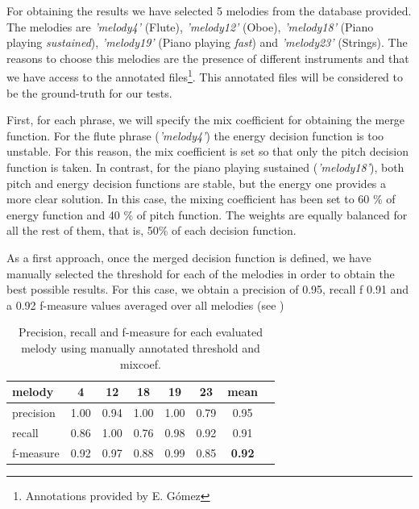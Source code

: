 \documentclass{article}
\begin{document}
For obtaining the results we have selected 5 melodies from the database provided. The melodies are \textit{'melody4'} (Flute), \textit{'melody12'} (Oboe), \textit{'melody18'} (Piano playing \textit{sustained}), \textit{'melody19'} (Piano playing \textit{fast}) and \textit{'melody23'} (Strings). The reasons to choose this melodies are the presence of different instruments and that we have access to the annotated files\footnote{Annotations provided by E. G\'omez}. This annotated files will be considered to be the ground-truth for our tests.
 
First, for each phrase, we will specify the mix coefficient for obtaining the merge function. For the flute phrase (\textit{'melody4'}) the energy decision function is too unstable. For this reason, the mix coefficient is set so that only the pitch decision function is taken. In contrast, for the piano playing sustained (\textit{'melody18'}), both pitch and energy decision functions are stable, but the energy one provides a more clear solution. In this case, the mixing coefficient has been set to 60 \% of energy function and 40 \% of pitch function. The weights are equally balanced for all the rest of them, that is, 50\% of each decision function.

As a first approach, once the merged decision function is defined, we have manually selected the threshold for each of the melodies in order to obtain the best possible results. For this case, we obtain a precision of 0.95, recall f 0.91 and a 0.92 f-measure values averaged over all melodies (see )

\begin{table}
 \begin{center}
 \begin{tabular}{|l|c|c|c|c|c|c|c|}
  \hline
  melody		&	4		&	12		&	18		&	19		&	23		&	mean			\\
  \hline
  precision	&	1.00		&	0.94		&	1.00		&	1.00		&	0.79 	&	0.95			\\
  recall 	&	0.86		&	1.00		&	0.76		&	0.98		&	0.92 	&	0.91			\\
  f-measure	&	0.92		&	0.97		&	0.88		&	0.99		&	0.85 	&	\textbf{0.92}	\\  
  \hline
 \end{tabular}
\end{center}
 \caption{Precision, recall and f-measure for each evaluated melody using manually annotated threshold and mixcoef.}
 \label{tab:manualfmeasure}
\end{table}
\end{document}
